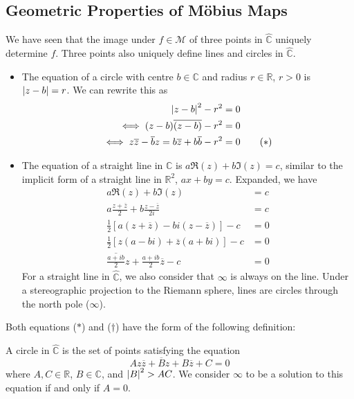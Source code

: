 \subsection{Geometric Properties of M\"obius Maps}
We have seen that the image under \(f \in \mathcal M\) of three points in \(\hat{\mathbb C}\) uniquely determine \(f\). Three points also uniquely define lines and circles in \(\hat{\mathbb C}\).
\begin{itemize}
	\item The equation of a circle with centre \(b \in \mathbb C\) and radius \(r \in \mathbb R\), \(r > 0\) is \(\abs{z-b} = r\). We can rewrite this as
	      \begin{align*}
		      \abs{z-b}^2 - r^2                                                        & = 0              \\
		      \iff (z-b)\overline{(z-b)} - r^2                                         & = 0              \\
		      \iff z\overline{z} - \overline{b}z = b\overline{z} + b\overline{b} - r^2 & = 0 \tag{\(\ast\)}
	      \end{align*}
	\item The equation of a straight line in \(\mathbb C\) is \(a \Re(z) + b \Im(z) = c\), similar to the implicit form of a straight line in \(\mathbb R^2\), \(ax+by=c\). Expanded, we have
	      \begin{align*}
		      a \Re(z) + b \Im(z)                                                      & = c                 \\
		      a \frac{z + \overline z}{2} + b \frac{z - \overline z}{2i}               & = c                 \\
		      \frac{1}{2}\left[ a (z + \overline z) - bi (z - \overline z) \right] - c & = 0                 \\
		      \frac{1}{2}\left[ z(a-bi) + \overline z(a+bi) \right] - c                & = 0                 \\
		      \overline{\frac{a + ib}{2}}z + \frac{a+ib}{2}\overline{z} - c            & = 0 \tag{\(\dagger\)}
	      \end{align*}
	      For a straight line in \(\hat{\mathbb C}\), we also consider that \(\infty\) is always on the line. Under a stereographic projection to the Riemann sphere, lines are circles through the north pole (\(\infty\)).
\end{itemize}
Both equations (\(\ast\)) and (\(\dagger\)) have the form of the following definition:
\begin{definition}
	A circle in \(\hat{\mathbb C}\) is the set of points satisfying the equation
	\[ Az\overline z + \overline B z + B \overline z + C = 0 \]
	where \(A, C \in \mathbb R\), \(B \in \mathbb C\), and \(\abs{B}^2 > AC\). We consider \(\infty\) to be a solution to this equation if and only if \(A = 0\).
\end{definition}
